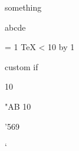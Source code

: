 
\if something \fi


 a\or b\or c\or d\else e\fi


 = 1
\loop
  \TeX
\ifnum{} < 10
\advance{} by 1
\repeat


\if@director
 custom if
\else
\fi

\relax




 10

\count"AB 10


\dimen'569

\dimen`\a  

